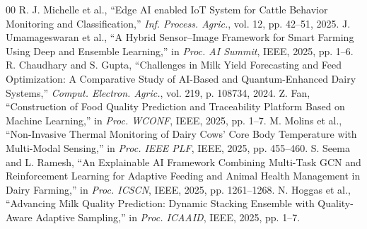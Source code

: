 \documentclass[conference]{IEEEtran}
\begin{document}
\begin{thebibliography}{00}
			 R. J. Michelle et al., ``Edge AI enabled IoT System for Cattle Behavior Monitoring and Classification,'' \textit{Inf. Process. Agric.}, vol. 12, pp. 42--51, 2025.
			 J. Umamageswaran et al., ``A Hybrid Sensor--Image Framework for Smart Farming Using Deep and Ensemble Learning,'' in \textit{Proc. AI Summit}, IEEE, 2025, pp. 1--6.
			 R. Chaudhary and S. Gupta, ``Challenges in Milk Yield Forecasting and Feed Optimization: A Comparative Study of AI-Based and Quantum-Enhanced Dairy Systems,'' \textit{Comput. Electron. Agric.}, vol. 219, p. 108734, 2024.
			 Z. Fan, ``Construction of Food Quality Prediction and Traceability Platform Based on Machine Learning,'' in \textit{Proc. WCONF}, IEEE, 2025, pp. 1--7.
			 M. Molins et al., ``Non-Invasive Thermal Monitoring of Dairy Cows' Core Body Temperature with Multi-Modal Sensing,'' in \textit{Proc. IEEE PLF}, IEEE, 2025, pp. 455--460.
			 S. Seema and L. Ramesh, ``An Explainable AI Framework Combining Multi-Task GCN and Reinforcement Learning for Adaptive Feeding and Animal Health Management in Dairy Farming,'' in \textit{Proc. ICSCN}, IEEE, 2025, pp. 1261--1268.
			 N. Hoggas et al., ``Advancing Milk Quality Prediction: Dynamic Stacking Ensemble with Quality-Aware Adaptive Sampling,'' in \textit{Proc. ICAAID}, IEEE, 2025, pp. 1--7.
		\end{thebibliography}
		
\end{document}
